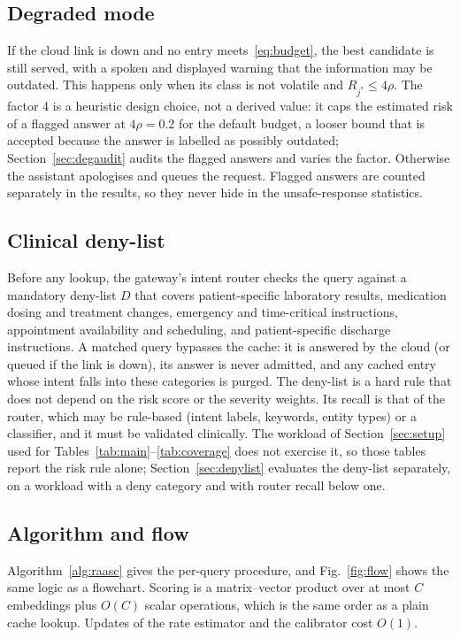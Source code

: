 \documentclass[journal]{IEEEtran}
\begin{document}
\subsection{Degraded mode}\label{sec:degraded}
If the cloud link is down and no entry meets~\eqref{eq:budget}, the best candidate is still served, with a spoken and displayed warning that the information may be outdated. This happens only when its class is not volatile and $R_{j^{*}}\le 4\rho$. The factor 4 is a heuristic design choice, not a derived value: it caps the estimated risk of a flagged answer at $4\rho=0.2$ for the default budget, a looser bound that is accepted because the answer is labelled as possibly outdated; Section~\ref{sec:degaudit} audits the flagged answers and varies the factor. Otherwise the assistant apologises and queues the request. Flagged answers are counted separately in the results, so they never hide in the unsafe-response statistics.

\subsection{Clinical deny-list}\label{sec:denydesign}
Before any lookup, the gateway's intent router checks the query against a mandatory deny-list $D$ that covers patient-specific laboratory results, medication dosing and treatment changes, emergency and time-critical instructions, appointment availability and scheduling, and patient-specific discharge instructions. A matched query bypasses the cache: it is answered by the cloud (or queued if the link is down), its answer is never admitted, and any cached entry whose intent falls into these categories is purged. The deny-list is a hard rule that does not depend on the risk score or the severity weights. Its recall is that of the router, which may be rule-based (intent labels, keywords, entity types) or a classifier, and it must be validated clinically. The workload of Section~\ref{sec:setup} used for Tables~\ref{tab:main}--\ref{tab:coverage} does not exercise it, so those tables report the risk rule alone; Section~\ref{sec:denylist} evaluates the deny-list separately, on a workload with a deny category and with router recall below one.

\subsection{Algorithm and flow}\label{sec:algo}
Algorithm~\ref{alg:raasc} gives the per-query procedure, and Fig.~\ref{fig:flow} shows the same logic as a flowchart. Scoring is a matrix--vector product over at most $C$ embeddings plus $O(C)$ scalar operations, which is the same order as a plain cache lookup. Updates of the rate estimator and the calibrator cost $O(1)$.
\end{document}
